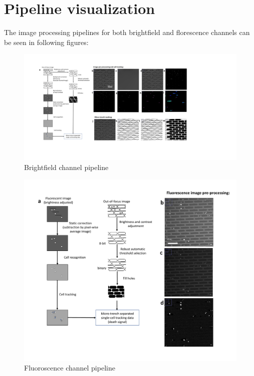 \documentclass[pdftex,12pt,a4paper]{report}
\begin{document}
\section{Pipeline visualization}

The image processing pipelines for both brightfield and florescence channels can be seen in following figures:


\begin{landscape}
\begin{figure}[H]
   \centering
    \includegraphics[height=0.95\textheight]{images/pipeline/01.pdf}
    \caption{Brightfield channel pipeline}
\end{figure}
\label{fig:pipeline1}
\end{landscape}

\begin{landscape}
\begin{figure}[H]
   \centering
    \includegraphics[height=\textheight]{images/pipeline/02.pdf}
    \caption{Fluoroscence channel pipeline}
\end{figure}
\label{fig:pipeline2}
\end{landscape}
\end{document}

